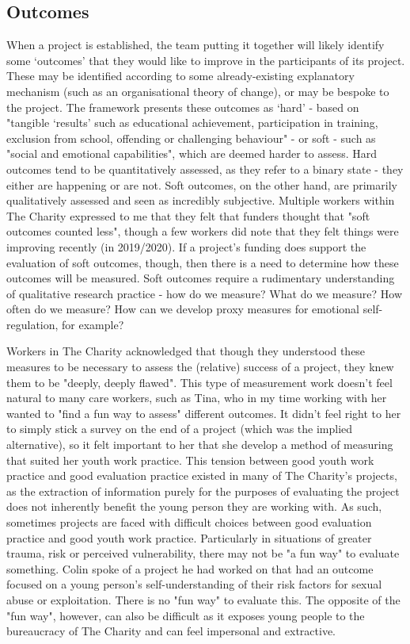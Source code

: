 \subsection{Outcomes}
\label{subsec:6-3-1-outcomes}
When a project is established, the team putting it together will likely identify some ‘outcomes’ that they would like to improve in the participants of its project. These may be identified according to some already-existing explanatory mechanism (such as an organisational theory of change), or may be bespoke to the project. The framework \citep[p. 7]{mcneil_framework_2012} presents these outcomes as `hard' - based on "tangible `results' such as educational achievement, participation in training, exclusion from school, offending or challenging behaviour" - or soft - such as "social and emotional capabilities", which are deemed harder to assess. Hard outcomes tend to be quantitatively assessed, as they refer to a binary state - they either are happening or are not. Soft outcomes, on the other hand, are primarily qualitatively assessed and seen as incredibly subjective. Multiple workers within The Charity expressed to me that they felt that funders thought that "soft outcomes counted less", though a few workers did note that they felt things were improving recently (in 2019/2020). If a project's funding does support the evaluation of soft outcomes, though, then there is a need to determine how these outcomes will be measured. Soft outcomes require a rudimentary understanding of qualitative research practice - how do we measure? What do we measure? How often do we measure? How can we develop proxy measures for emotional self-regulation, for example? 

Workers in The Charity acknowledged that though they understood these measures to be necessary to assess the (relative) success of a project, they knew them to be "deeply, deeply flawed". This type of measurement work doesn't feel natural to many care workers, such as Tina, who in my time working with her wanted to "find a fun way to assess" different outcomes. It didn't feel right to her to simply stick a survey on the end of a project (which was the implied alternative), so it felt important to her that she develop a method of measuring that suited her youth work practice. This tension between good youth work practice and good evaluation practice existed in many of The Charity's projects, as the extraction of information purely for the purposes of evaluating the project does not inherently benefit the young person they are working with. As such, sometimes projects are faced with difficult choices between good evaluation practice and good youth work practice. Particularly in situations of greater trauma, risk or perceived vulnerability, there may not be "a fun way" to evaluate something. Colin spoke of a project he had worked on that had an outcome focused on a young person's self-understanding of their risk factors for sexual abuse or exploitation. There is no "fun way" to evaluate this. The opposite of the "fun way", however, can also be difficult as it exposes young people to the bureaucracy of The Charity and can feel impersonal and extractive. 

